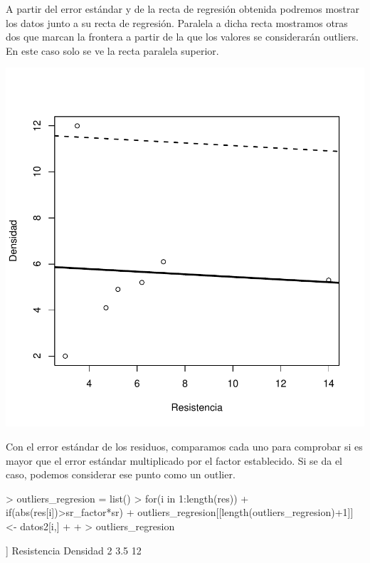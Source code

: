 \documentclass [a4paper] {article}
\begin{document}
A partir del error estándar y de la recta de regresión obtenida podremos mostrar los datos junto a su recta de regresión.
Paralela a dicha recta mostramos otras dos que marcan la frontera a partir de la que los valores se considerarán outliers.
En este caso solo se ve la recta paralela superior.

\begin{center}
\includegraphics{entrega-regresion_plot}
\end{center}

Con el error estándar de los residuos, comparamos cada uno para comprobar si es mayor que el error estándar multiplicado por el factor establecido.
Si se da el caso, podemos considerar ese punto como un outlier.

\begin{Schunk}
\begin{Sinput}
> outliers_regresion = list()
> for(i in 1:length(res)){
+   if(abs(res[i])>sr_factor*sr){
+     outliers_regresion[[length(outliers_regresion)+1]] <- datos2[i,]
+   }
+ }
> outliers_regresion
\end{Sinput}
\begin{Soutput}
[[1]]
  Resistencia Densidad
2         3.5       12
\end{Soutput}
\end{Schunk}
\end{document}
